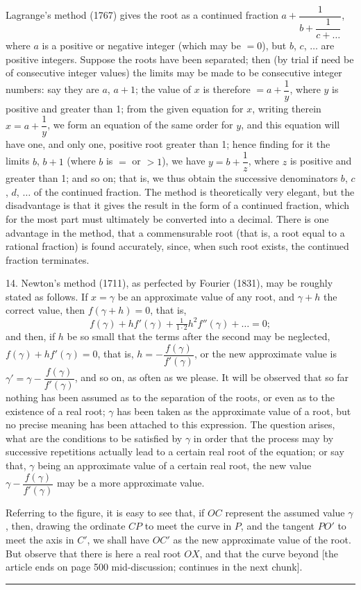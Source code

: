 \documentclass[12pt,a4paper,oneside]{book}
\begin{document}
Lagrange's method (1767) gives the root as a continued fraction $a+\dfrac{1}{b+\dfrac{1}{c+\dots}}$, where $a$ is a positive or negative integer (which may be $=0$), but $b$, $c$, $\dots$ are positive integers. Suppose the roots have been separated; then (by trial if need be of consecutive integer values) the limits may be made to be consecutive integer numbers: say they are $a$, $a+1$; the value of $x$ is therefore $=a+\dfrac{1}{y}$, where $y$ is positive and greater than 1; from the given equation for $x$, writing therein $x=a+\dfrac{1}{y}$, we form an equation of the same order for $y$, and this equation will have one, and only one, positive root greater than 1; hence finding for it the limits $b$, $b+1$ (where $b$ is $=$ or $>1$), we have $y=b+\dfrac{1}{z}$, where $z$ is positive and greater than 1; and so on; that is, we thus obtain the successive denominators $b$, $c$, $d$, $\dots$ of the continued fraction. The method is theoretically very elegant, but the disadvantage is that it gives the result in the form of a continued fraction, which for the most part must ultimately be converted into a decimal. There is one advantage in the method, that a commensurable root (that is, a root equal to a rational fraction) is found accurately, since, when such root exists, the continued fraction terminates.

14. Newton's method (1711), as perfected by Fourier (1831), may be roughly stated as follows. If $x=\gamma$ be an approximate value of any root, and $\gamma+h$ the correct value, then $f(\gamma+h)=0$, that is,
\[
f(\gamma)+hf'(\gamma)+\tfrac{1}{1\cdot 2}h^{2}f''(\gamma)+\dots = 0;
\]
and then, if $h$ be so small that the terms after the second may be neglected, $f(\gamma)+hf'(\gamma)=0$, that is, $h=-\dfrac{f(\gamma)}{f'(\gamma)}$, or the new approximate value is $\gamma'=\gamma-\dfrac{f(\gamma)}{f'(\gamma)}$, and so on, as often as we please. It will be observed that so far nothing has been assumed as to the separation of the roots, or even as to the existence of a real root; $\gamma$ has been taken as the approximate value of a root, but no precise meaning has been attached to this expression. The question arises, what are the conditions to be satisfied by $\gamma$ in order that the process may by successive repetitions actually lead to a certain real root of the equation; or say that, $\gamma$ being an approximate value of a certain real root, the new value $\gamma-\dfrac{f(\gamma)}{f'(\gamma)}$ may be a more approximate value.

Referring to the figure, it is easy to see that, if $OC$ represent the assumed value $\gamma$, then, drawing the ordinate $CP$ to meet the curve in $P$, and the tangent $PO'$ to meet the axis in $C'$, we shall have $OC'$ as the new approximate value of the root. But observe that there is here a real root $OX$, and that the curve beyond [the article ends on page 500 mid-discussion; continues in the next chunk].

\vspace{1em}
\begin{center}
\rule{0.5\textwidth}{0.4pt}
\end{center}
\vspace{1em}

\end{document}

